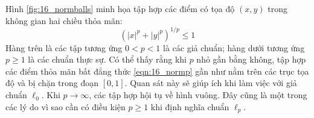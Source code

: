 Hình \ref{fig:16_normballs} minh họa tập hợp các điểm có tọa độ $(x, y)$ trong không gian hai chiều thỏa mãn:
\begin{equation}
\label{eqn:16_normp}
(|x|^p + |y|^p)^{1/p} \leq 1
\end{equation}
Hàng trên là các tập tương ứng $0 < p < 1$ là các giả chuẩn; hàng dưới tương
ứng $p \geq 1$ là các chuẩn thực sự. Có thể thấy rằng khi $p$ nhỏ
gần bằng không, tập hợp các điểm thỏa mãn bất đẳng thức \eqref{eqn:16_normp} gần như
nằm trên các trục tọa độ và bị chặn trong đoạn $[0, 1]$. Quan sát này sẽ giúp
ích khi làm việc với giả chuẩn $\ell_0$. Khi $p \rightarrow
\infty$, các tập hợp hội tụ về hình vuông.
Đây cũng là một trong các lý do vì sao cần có điều kiện $p \geq 1$ khi định
nghĩa chuẩn $\ell_p$.






